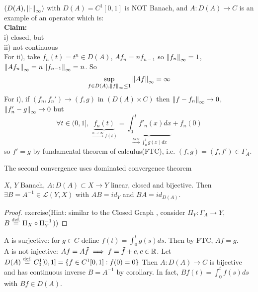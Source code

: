 \documentclass{article}
\begin{document}
\begin{example}\nl
	$(D(A),\left\|{\cdot}\right\|_\infty)$ with $D(A)=C^1[0,1]$ is NOT Banach, and $A:D(A)\to C$ is an example of an operator which is:\\
	\textbf{Claim: }\\
	i) closed, but\\
	ii) not continuous\\
	For ii), take $f_n(t)=t^n\in D(A)$, $Af_n=nf_{n-1}$ so $\left\|{f_n}\right\|_\infty=1$, $\left\|{Af_n}\right\|_\infty=n\left\|{f_{n-1}}\right\|_\infty=n$. So 
	$$ \sup_{f\in D(A),\left\|{f}\right\|_\infty\leq1}\left\|{Af}\right\|_\infty=\infty$$
	For i), if $(f_n,f_n')\to(f,g)$ in $(D(A)\times C)$ then $\left\|{f-f_n}\right\|_\infty\to 0$, $\left\|{f_n'-g}\right\|_\infty\to0$ but
	$$
	\forall t\in(0,1],\,\underbrace{f_n(t)}_{\overset{n\to\infty}{\longrightarrow}f(t)}
	=\underbrace{\int_0^t f'_n(x) dx}_{\overset{DCT}{\longrightarrow}\int_0^t g(x) dx}
	+f_n(0)
	$$
	so $f'=g$ by fundamental theorem of calculus(FTC), i.e. $(f,g)=(f,f')\in\Gamma_A$. 
 \begin{unexaminable}
The second convergence uses dominated convergence theorem
 \end{unexaminable}
\end{example}


\begin{corollary}\nl
	$X$, $Y$ Banach, $A:D(A)\subset X\to Y$ linear, closed and bijective. Then $\exists B=A^{-1}\in\mathcal{L}(Y,X)$ with $AB=id_Y$ and $BA=id_{D(A)}$. 
\end{corollary}
\begin{proof}
    exercise(Hint: similar to the Closed Graph , consider $\Pi_Y:\Gamma_A\to Y$, $B\stackrel{\text{def.}}{=}\Pi_X\circ \Pi_Y^{-1}$))
\end{proof}

\begin{example}[???]\nl
	A is surjective: for $g\in C$ define $f(t)=\int_0^t g(s) ds$. Then by FTC, $Af=g$.\\
	A is not injective: $Af=A\tilde{f}\implies f=\tilde{f}+c,c\in\mathbb{R}$. 
	Let $D(A)\stackrel{\text{def.}}{=} C_0^1[0,1]=\{f\in C^1[0,1]:f(0)=0\}$
	Then $A:D(A)\to C$ is bijective and has continuous inverse $B=A^{-1}$ by corollary. In fact, $Bf(t)=\int_0^tf(s)ds$ with $Bf\in D(A)$.
\end{example}
\end{document}

